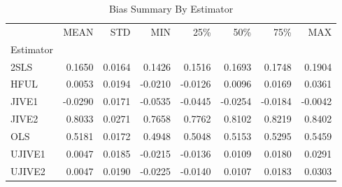 \begin{table}[ht]
\centering
\caption{Bias Summary By Estimator}
\begin{tabular}{lrrrrrrr}
\toprule
 & MEAN & STD & MIN & 25\% & 50\% & 75\% & MAX \\
Estimator &  &  &  &  &  &  &  \\
\midrule
2SLS & 0.1650 & 0.0164 & 0.1426 & 0.1516 & 0.1693 & 0.1748 & 0.1904 \\
HFUL & 0.0053 & 0.0194 & -0.0210 & -0.0126 & 0.0096 & 0.0169 & 0.0361 \\
JIVE1 & -0.0290 & 0.0171 & -0.0535 & -0.0445 & -0.0254 & -0.0184 & -0.0042 \\
JIVE2 & 0.8033 & 0.0271 & 0.7658 & 0.7762 & 0.8102 & 0.8219 & 0.8402 \\
OLS & 0.5181 & 0.0172 & 0.4948 & 0.5048 & 0.5153 & 0.5295 & 0.5459 \\
UJIVE1 & 0.0047 & 0.0185 & -0.0215 & -0.0136 & 0.0109 & 0.0180 & 0.0291 \\
UJIVE2 & 0.0047 & 0.0190 & -0.0225 & -0.0140 & 0.0107 & 0.0183 & 0.0303 \\
\bottomrule
\end{tabular}
\end{table}
